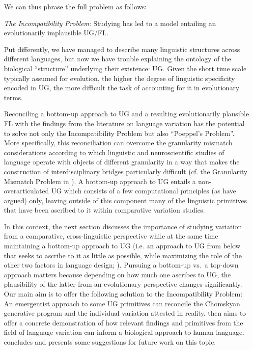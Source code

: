 \documentclass[output=paper]{langsci/langscibook}
\begin{document}
We can thus phrase the full problem as follows:

\ea \emph{The Incompatibility Problem}:
Studying  has led to a model entailing an evolutionarily
    implausible \gls{UG}/\gls{FL}.
\z

Put differently, we have managed to describe many linguistic structures across
different languages, but now we have trouble explaining the ontology of the
biological \enquote{structure} underlying their existence: \gls{UG}.  Given the short
time scale typically assumed for evolution, the higher the degree of linguistic
specificity encoded in \gls{UG}, the more difficult the task of accounting for
it in evolutionary terms.

Reconciling a bottom-up approach to \gls{UG} and a resulting evolutionarily
plausible \gls{FL} with the findings from the literature on language variation
has the potential to solve not only the Incompatibility Problem but also
\enquote{Poeppel's Problem}. More specifically, this reconciliation can overcome the
granularity mismatch considerations according to which linguistic and
neuroscientific studies of language operate with objects of different
granularity in a way that makes the construction of interdisciplinary bridges
particularly difficult (cf. the Granularity Mismatch Problem in
\citealt{PoeEmb2005}). A bottom-up approach to \gls{UG} entails a
non-overarticulated \gls{UG} which consists of a few computational principles
(as \citealt{DiSciulloEtAl2010} have argued) only, leaving outside of this
component many of the linguistic primitives that have been ascribed to it
within comparative variation studies.

In this context, the next section discusses the importance of studying
variation from a comparative, cross-linguistic perspective while at the same
time maintaining a bottom-up approach to \gls{UG} (i.e. an approach to \gls{UG}
from below that seeks to ascribe to it as little as possible, while maximizing
the role of the other two factors in language design; \citealt{Chomsky2007}).
Pursuing a bottom-up vs.\ a top-down approach matters because depending on how
much one ascribes to \gls{UG}, the plausibility of the latter from an
evolutionary perspective changes significantly. Our main aim is to offer the
following solution to the Incompatibility Problem: An emergentist approach to
some \gls{UG} primitives can reconcile the Chomskyan generative program and the
individual variation attested in reality.  then aims to
offer a concrete demonstration of how relevant findings and primitives from the
field of language variation can inform a biological approach to human language.
 concludes and presents some suggestions for future work on
this topic.
\end{document}
